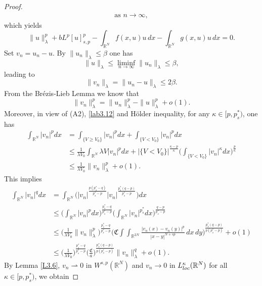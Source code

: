 \documentclass[10pt,a4paper]{amsart}
\numberwithin{equation}{section}
\begin{document}
\begin{proof}
\begin{align*}
  \text{as } n\to \infty,
\end{align*}
which yields
\begin{equation}\label{lab3.16}
\|u\|^p_\lambda+bL^p[u]^p_{s,p} -\int_{\mathbb{R}^N}f(x,u)u\,dx
-\int_{\mathbb{R}^N}g(x,u)u\,dx=0.
\end{equation}
Set $v_n=u_n-u$. By $\|u_n\|_\lambda\leq \beta$ one has
\[
\|u\|_\lambda \leq \liminf_{n\to \infty}\|u_n\|_\lambda\leq\beta,
\]
leading to
\begin{equation}\label{lab3.17}
\|v_n\|_\lambda=\|u_n-u\|_\lambda\leq 2\beta.
\end{equation}
From the Br\'{e}zis-Lieb Lemma \cite{r3} we know that
\begin{equation}\label{lab3.18}
\|v_n\|^p_\lambda=\|u_n\|^p_\lambda-\|u\|^p_\lambda+o(1).
\end{equation}
Moreover, in view of (A2), \eqref{lab3.12} and H\"older inequality,
for any $\kappa\in[p, p^*_s)$, one has
\begin{align*}
\int_{\mathbb{R}^N}|v_n|^pdx
&=\int_{\{V\geq V_0\}}|v_n|^pdx+\int_{\{V<V_0\}}|v_n|^pdx      \\
&\leq \frac{1}{\lambda V_0}\int_{\mathbb{R}^N}\lambda V|v_n|^pdx
 +|{\{V<V_0\}}|^{\frac{\kappa-p}{\kappa}}
 \Big(\int_{\{V<V_0\}}|v_n|^\kappa dx\Big)^{\frac{p}{\kappa}}   \\
&\leq \frac{1}{\lambda V_0}\|v_n\|^p_\lambda+o(1).
\end{align*}
This implies
\begin{equation}\label{lab3.19}
\begin{split}
\int_{\mathbb{R}^N}|v_n|^q dx
&=  \int_{\mathbb{R}^N}\Big(|v_n|^{\frac{p(p_s^*-q)}{p_s^*-p}}
 |v_n|^{\frac{p_s^*(q-p)}{p_s^*-p}}\Big)dx \\
&\leq  \Big(\int_{\mathbb{R}^N}|v_n|^pdx\Big)^{\frac{p_s^*-q}{p_s^*-p}} 
 \Big(\int_{\mathbb{R}^N}|v_n|^{p_s^*} dx \Big)^{\frac{q-p}{p_s^*-p}}  \\
&\leq   \Big(\frac{1}{\lambda V_0}\|v_n\|^p_\lambda \Big)^{\frac{p_s^*-q}{p_s^*-p}}
 \Big(\mathfrak{C}\int\int_{\mathbb{R}^{2N}}\frac{|v_n(x)-v_n(y)|^p}{|x-y|^{N+sp}}\,dx\,dy\Big)^{\frac{p_s^*(q-p)}{p(p_s^*-p)}}+o(1)  \\
&\leq   \Big(\frac{1}{\lambda V_0}\Big)^{\frac{p_s^*-q}{p_s^*-p}}
 \Big(\frac{\mathfrak{C}}{a}\Big)^{\frac{p_s^*(q-p)}{p(p_s^*-p)}}\|v_n\|^q_\lambda+o(1).
\end{split}
\end{equation}
By Lemma \ref{L3.6}, $v_n\rightharpoonup0$ in $W^{s,p}(\mathbb{R}^N)$ and $v_n\to  0$ 
in $L^\kappa_{\rm loc}(\mathbb{R}^N)$ for all $\kappa\in[p,p_s^*)$, we obtain

\end{proof}
\end{document}
